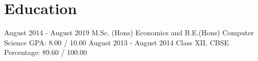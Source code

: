 \section{Education}\label{sec:education}
\resumeSubHeadingListStart
{} {August 2014 - August 2019} {M.Sc. (Hons) Economics and B.E.(Hons) Computer Science} {GPA: 8.00 / 10.00}
 {August 2013 - August 2014} {Class XII, CBSE} {Percentage: 89.60 / 100.00}
\resumeSubHeadingListEnd